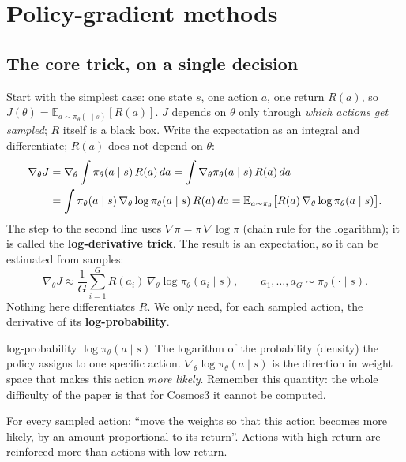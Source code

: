 \documentclass[11pt,a4paper]{article}
\newcommand{\E}{\mathbb{E}}
\begin{document}
\section{Policy-gradient methods}\label{sec:pg}

\subsection{The core trick, on a single decision}
Start with the simplest case: one state $s$, one action $a$, one return $R(a)$, so $J(\theta)=\E_{a\sim\pi_\theta(\cdot\mid s)}[R(a)]$. $J$ depends on $\theta$ only through \emph{which actions get sampled}; $R$ itself is a black box. Write the expectation as an integral and differentiate; $R(a)$ does not depend on $\theta$:
\begin{align}
\nabla_\theta J
&=\nabla_\theta\int\pi_\theta(a\mid s)\,R(a)\,da
=\int\nabla_\theta\pi_\theta(a\mid s)\,R(a)\,da \notag\\
&=\int\pi_\theta(a\mid s)\,\nabla_\theta\log\pi_\theta(a\mid s)\,R(a)\,da
=\E_{a\sim\pi_\theta}\big[R(a)\,\nabla_\theta\log\pi_\theta(a\mid s)\big].
\label{eq:pg}
\end{align}
The step to the second line uses $\nabla\pi=\pi\,\nabla\log\pi$ (chain rule for the logarithm); it is called the \textbf{log-derivative trick}. The result is an expectation, so it can be estimated from samples:
\begin{equation}
\nabla_\theta J\approx\frac1G\sum_{i=1}^{G}R(a_i)\,\nabla_\theta\log\pi_\theta(a_i\mid s),\qquad a_1,\dots,a_G\sim\pi_\theta(\cdot\mid s).
\label{eq:pg-est}
\end{equation}
Nothing here differentiates $R$. We only need, for each sampled action, the derivative of its \textbf{log-probability}.

\begin{newc}{log-probability $\log\pi_\theta(a\mid s)$}
The logarithm of the probability (density) the policy assigns to one specific action. $\nabla_\theta\log\pi_\theta(a\mid s)$ is the direction in weight space that makes this action \emph{more likely}. Remember this quantity: the whole difficulty of the paper is that for Cosmos3 it cannot be computed.
\end{newc}

\begin{intuition}
For every sampled action: ``move the weights so that this action becomes more likely, by an amount proportional to its return''. Actions with high return are reinforced more than actions with low return.
\end{intuition}
\end{document}

